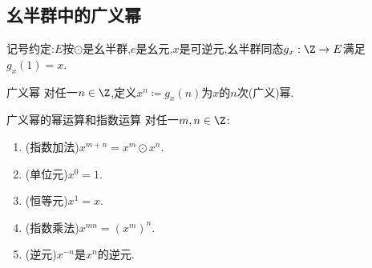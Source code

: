\subsection*{幺半群中的广义幂}

记号约定:$E$按$\odot$是幺半群,$e$是幺元,$x$是可逆元,幺半群同态$g_{x}:\Z\to E$满足$g_{x}\left(1\right)=x$.

\begin{definition}{广义幂}{}
	对任一$n\in\Z$,定义$x^{n}\coloneq g_{x}\left(n\right)$为$x$的$n$次(广义)幂.
\end{definition}

\begin{theorem}{广义幂的幂运算和指数运算}{}
	对任一$m,n\in\Z$:
	\begin{enumerate}
		\item (指数加法)$x^{m+n}=x^{m}\odot x^{n}$.
		\item (单位元)$x^{0}=1$.
		\item (恒等元)$x^{1}=x$.
		\item (指数乘法)$x^{mn}=\left(x^{m}\right)^{n}$.
		\item (逆元)$x^{-n}$是$x^{n}$的逆元.
	\end{enumerate}
\end{theorem}



























